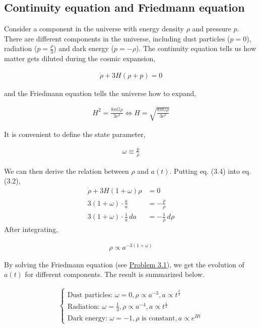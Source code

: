 \documentclass[12pt]{book} %
\numberwithin{equation}{chapter}
\def\w{\omega}
\def\iff{\Longleftrightarrow}
\begin{document}
\subsection*{Continuity equation and Friedmann equation}
Consider a component in the universe with energy density $\rho$ and pressure $p$. There are different components in the universe, including dust particles ($p=0$), radiation ($p=\frac{\rho}{3}$) and dark energy ($p=-\rho$).\bigskip\newline
The continuity equation tells us how matter gets diluted during the cosmic expansion,
\begin{eqnbox}
\begin{align}
\dot{\rho}+3H(\rho+p)=0
\end{align}
\end{eqnbox}
and the Friedmann equation tells the universe how to expand,
\begin{eqnbox}
\begin{align}
H^{2}=\frac{8\pi G\rho}{3c^2}\iff H=\sqrt{\frac{8\pi G\rho}{3c^2}}
\end{align}
\end{eqnbox}
It is convenient to define the state parameter,
\begin{eqnbox}
\begin{align}
\omega\equiv\frac{p}{\rho}
\end{align}
\end{eqnbox}
We can then derive the relation between $\rho$ and $a(t)$. Putting eq. (3.4) into eq. (3.2),
\begin{align*}
\dot{\rho}+3H(1+\w)\rho&=0\\
3(1+\w)\cdot\frac{\dot{a}}{a}&=-\frac{\dot{\rho}}{\rho}\\
3(1+\w)\cdot\frac{1}{a}\,da&=-\frac{1}{\rho}\,d\rho\nonumber
\end{align*}
After integrating,
\begin{eqnbox}
\begin{align}
\rho\propto a^{-3(1+\w)}
\end{align}
\end{eqnbox}
By solving the Friedmann equation (see \hyperref[Problem 3.1]{Problem 3.1}), we get the evolution of $a(t)$ for different components. The result is summarized below.
\begin{eqnbox}
\begin{align}
\begin{cases}
\text{Dust particles: }\w=0, \rho\propto a^{-3}, a\propto t^{\frac{2}{3}}\\
\text{Radiation: }\w=\frac{1}{3}, \rho\propto a^{-4}, a\propto t^{\frac{1}{2}}\\
\text{Dark energy: }\w=-1, \rho\text{ is constant}, a\propto e^{Ht}
\end{cases}
\end{align}
\end{eqnbox}
\end{document}
